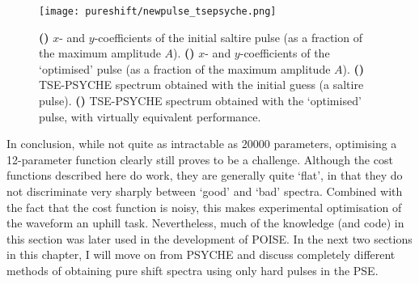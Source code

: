 \begin{figure}[htb]
    \centering
    \texttt{[image: pureshift/newpulse\_tsepsyche.png]}
    {\label{fig:newpulse_tsepsyche_saltire}}
    {\label{fig:newpulse_tsepsyche_newpulse}}
    {\label{fig:newpulse_tsepsyche_saltirespec}}
    {\label{fig:newpulse_tsepsyche_newpulsespec}}
    \caption[Evaluation of an `optimised' pulse in a TSE-PSYCHE experiment]{
        \textbf{()} $x$- and $y$-coefficients of the initial saltire pulse (as a fraction of the maximum amplitude $A$).
        \textbf{()} $x$- and $y$-coefficients of the `optimised' pulse (as a fraction of the maximum amplitude $A$).
        \textbf{()} TSE-PSYCHE spectrum obtained with the initial guess (a saltire pulse).
        \textbf{()} TSE-PSYCHE spectrum obtained with the `optimised' pulse, with virtually equivalent performance.
    }
    \label{fig:newpulse_tsepsyche}
\end{figure}

In conclusion, while not quite as intractable as 20000 parameters, optimising a 12-parameter function clearly still proves to be a challenge.
Although the cost functions described here do work, they are generally quite `flat', in that they do not discriminate very sharply between `good' and `bad' spectra.
Combined with the fact that the cost function is noisy, this makes experimental optimisation of the waveform an uphill task.
Nevertheless, much of the knowledge (and code) in this section was later used in the development of POISE.
In the next two sections in this chapter, I will move on from PSYCHE and discuss completely different methods of obtaining pure shift spectra using only hard pulses in the PSE.
